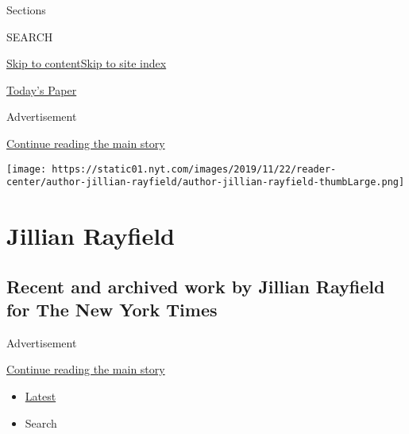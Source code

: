 Sections

SEARCH

\protect\hyperlink{site-content}{Skip to
content}\protect\hyperlink{site-index}{Skip to site index}

\href{https://myaccount.nytimes.com/auth/login?response_type=cookie\&client_id=vi}{}

\href{https://www.nytimes.com/section/todayspaper}{Today's Paper}

Advertisement

\protect\hyperlink{after-top}{Continue reading the main story}

\texttt{[image: https://static01.nyt.com/images/2019/11/22/reader-center/author-jillian-rayfield/author-jillian-rayfield-thumbLarge.png]}

\hypertarget{jillian-rayfield}{%
\section{Jillian Rayfield}\label{jillian-rayfield}}

\hypertarget{recent-and-archived-work-by-jillian-rayfield-for-the-new-york-times}{%
\subsection{Recent and archived work by Jillian Rayfield for The New
York
Times}\label{recent-and-archived-work-by-jillian-rayfield-for-the-new-york-times}}

Advertisement

\protect\hyperlink{after-mid1}{Continue reading the main story}

\begin{itemize}
\tightlist
\item
  \protect\hyperlink{stream-panel}{Latest}
\item
  Search
\end{itemize}

